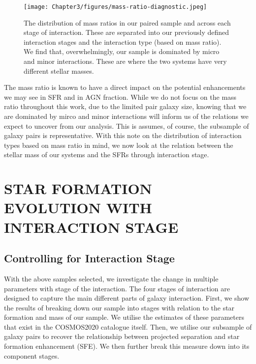 \begin{figure}
    \centering
    \texttt{[image: Chapter3/figures/mass-ratio-diagnostic.jpeg]}
    \caption[The distribution of mass ratios in our paired sample and across each stage of interaction.]{The distribution of mass ratios in our paired sample and across each stage of interaction. These are separated into our previously defined interaction stages and the interaction type (based on mass ratio). We find that, overwhelmingly, our sample is dominated by micro and minor interactions. These are where the two systems have very different stellar masses.}
    \label{fig:proj-seps-limits}
\end{figure}

The mass ratio is known to have a direct impact on the potential enhancements we may see in SFR and in AGN fraction. While we do not focus on the mass ratio throughout this work, due to the limited pair galaxy size, knowing that we are dominated by mirco and minor interactions will inform us of the relations we expect to uncover from our analysis. This is assumes, of course, the subsample of galaxy pairs is representative. With this note on the distribution of interaction types based on mass ratio in mind, we now look at the relation between the stellar mass of our systems and the SFRs through interaction stage.


\section{STAR FORMATION EVOLUTION WITH INTERACTION STAGE}\label{results:SF_stage}
\subsection{Controlling for Interaction Stage}
\noindent With the above samples selected, we investigate the change in multiple parameters with stage of the interaction. The four stages of interaction are designed to capture the main different parts of galaxy interaction. First, we show the results of breaking down our sample into stages with relation to the star formation and mass of our sample. We utilise the estimates of these parameters that exist in the COSMOS2020 catalogue itself. Then, we utilise our subsample of galaxy pairs to recover the relationship between projected separation and star formation enhancement (SFE). We then further break this measure down into its component stages.

